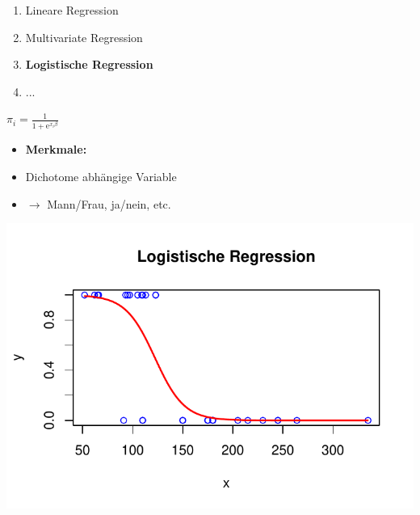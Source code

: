 \documentclass[aspectratio=169, journal, x11names, unknownkeysallowed, hyperref={colorlinks,
linkcolor = SS2,
urlcolor  = F3,
citecolor = F3,
anchorcolor = A4}, 12pt]{beamer}
\newcommand{\oarrow}{\textcolor{A1}{$\rightarrow$} }
\begin{document}
    \begin{frame}[t]
      \begin{minipage}{0.45\textwidth}
        \vspace{1em}
        \begin{enumerate}
          \item Lineare Regression
          \item Multivariate Regression
          \item \textbf{Logistische Regression}
          \item ...
        \end{enumerate}
    \end{minipage}%
    \begin{minipage}[t]{0.45\textwidth}
      \begin{tcolorbox}
        \begin{center}
          $\pi_i = \frac{1}{1+\mathrm{e}^{x_i \beta}} $
        \end{center}
      \end{tcolorbox}
      \begin{itemize}
        \item[] \textbf{Merkmale:}
        \item Dichotome abhängige Variable
        \item[] \oarrow Mann/Frau, ja/nein, etc.
      \end{itemize}
      \centering
      \includegraphics[scale=0.5]{../Plots/log_lin_1.pdf}
    \end{minipage}
    \end{frame}
\end{document}
